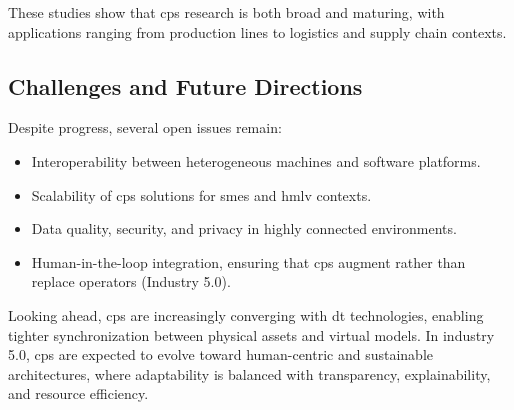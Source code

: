 These studies show that \ac{cps} research is both broad and maturing, with applications ranging from production lines to logistics and supply chain contexts.

\subsection{Challenges and Future Directions}

Despite progress, several open issues remain:

\begin{itemize}
    \item Interoperability between heterogeneous machines and software platforms.
    \item Scalability of \ac{cps} solutions for \ac{sme}s and \ac{hmlv} contexts.
    \item Data quality, security, and privacy in highly connected environments.
    \item Human-in-the-loop integration, ensuring that \ac{cps} augment rather than replace operators (Industry 5.0).
\end{itemize}

Looking ahead, \ac{cps} are increasingly converging with \ac{dt} technologies, enabling tighter synchronization between physical assets and virtual models.
In industry 5.0, \ac{cps} are expected to evolve toward human-centric and sustainable architectures, where adaptability is balanced with transparency, explainability, and resource efficiency.

